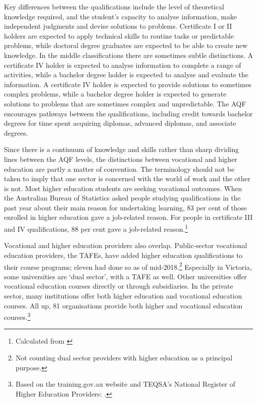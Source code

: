 \documentclass{grattan}
\begin{document}
Key differences between the qualifications include the level of theoretical knowledge required, and the student's capacity to analyse information, make independent judgments and devise solutions to problems. Certificate I or II holders are expected to apply technical skills to routine tasks or predictable problems, while doctoral degree graduates are expected to be able to create new knowledge. In the middle classifications there are sometimes subtle distinctions. A certificate IV holder is expected to analyse information to complete a range of activities, while a bachelor degree holder is expected to analyse and evaluate the information. A certificate IV holder is expected to provide solutions to sometimes complex problems, while a bachelor degree holder is expected to generate solutions to problems that are sometimes complex and unpredictable. The AQF encourages pathways between the qualifications, including credit towards bachelor degrees for time spent acquiring diplomas, advanced diplomas, and associate degrees.

Since there is a continuum of knowledge and skills rather than sharp dividing lines between the AQF levels, the distinctions between vocational and higher education are partly a matter of convention. The terminology should not be taken to imply that one sector is concerned with the world of work and the other is not. Most higher education students are seeking vocational outcomes. When the Australian Bureau of Statistics asked people studying qualifications in the past year about their main reason for undertaking learning, 83 per cent of those enrolled in higher education gave a job-related reason. For people in certificate III and IV qualifications, 88 per cent gave a job-related reason.\footnote{Calculated from \textcite[][]{ABS2018microdataworkrel}}

Vocational and higher education providers also overlap. Public-sector vocational education providers, the TAFEs, have added higher education qualifications to their course programs; eleven had done so as of mid-2018.\footnote{Not counting dual sector providers with higher education as a principal purpose.} Especially in Victoria, some universities are `dual sector', with a TAFE as well. Other universities offer vocational education courses directly or through subsidiaries. In the private sector, many institutions offer both higher education and vocational education courses. All up, 81 organisations provide both higher and vocational education courses.\footnote{Based on the training.gov.au website and TEQSA's National Register of Higher Education Providers: \textcite[][]{TEQSA2018statisticsreporto}.}
\end{document}
